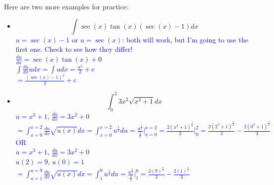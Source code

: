 \documentclass{ximera}
\begin{document}
\begin{exercise}
    Here are two more examples for practice: 
        \begin{itemize}
            \item $$\int \sec(x)\tan(x)(\sec(x)-1)dx$$
            \textcolor{blue}{$u=\sec(x)-1$ or $u=\sec(x)$: both will work, but I'm going to use the first one.  Check to see how they differ!\\
            $\frac{du}{dx}=\sec(x)\tan(x)+0$\\
            $\int \frac{du}{dx}udx=\int udx=\frac{u^2}{2}+c$\\
            $=\frac{(\sec(x)-1)^2}{2}+c$}

            \item $$\int_0^2 3x^2\sqrt{x^3+1}dx$$
            \textcolor{blue}{$u=x^3+1$, $\frac{du}{dx}=3x^2+0$}\\
            \textcolor{blue}{
            $=\int_{x=0}^{x=2} \frac{du}{dx}\sqrt{u(x)}dx=\int_{x=0}^{x=2} u^{\frac{1}{2}}du=\frac{u^{\frac{3}{2}}}{\frac{3}{2}}\bigg|_{x=0}^{x=2}=\frac{2(x^3+1)^{\frac{3}{2}}}{3}\bigg|_0^2=\frac{2(2^3+1)^{\frac{3}{2}}}{3}-\frac{2(0^3+1)^{\frac{3}{2}}}{3}$}\\

            \textcolor{blue}{OR}\\
            \textcolor{blue}{$u=x^3+1$, $\frac{du}{dx}=3x^2+0$}\\
            \textcolor{blue}{$u(2)=9$, $u(0)=1$}\\
            \textcolor{blue}{$=\int_{u=1}^{u=9} \frac{du}{dx}\sqrt{u(x)}dx=\int_{1}^{9} u^{\frac{1}{2}}du=\frac{u^{\frac{3}{2}}}{\frac{3}{2}}\bigg|_{1}^{9}=\frac{2(9)^{\frac{3}{2}}}{3}-\frac{2(1)^{\frac{3}{2}}}{3}$}
        \end{itemize}

\end{exercise}
\end{document}
